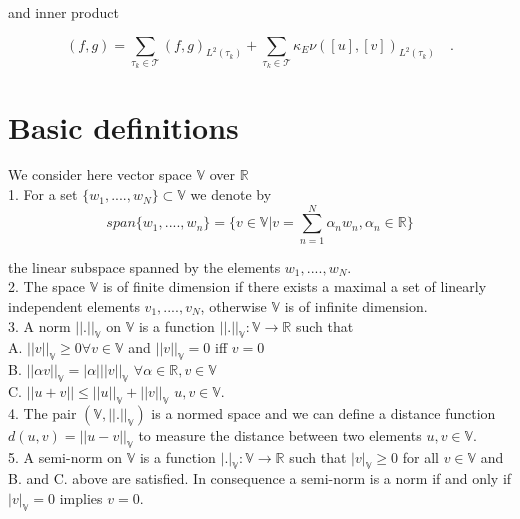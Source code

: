 \documentclass[a4paper]{book}
\begin{document}
and inner product

\begin{equation}
(f,g) = \sum_{\tau_k \in \mathcal{T}} (f,g)_{L^2(\tau_k)} + \sum_{\tau_k \in \mathcal{T}} \kappa_E \nu ([u],[v])_{L^2 (\tau_k)} \quad \textrm{.}
\end{equation}

\section{Basic definitions}

We consider here vector space $\mathbb{V}$ over $\mathbb{R}$\\

1. For a set $\lbrace w_1,....,w_N \rbrace \subset \mathbb{V}$ we denote by \\
\begin{equation} \label{vector space}
span \lbrace w_1,....,w_n \rbrace = \lbrace v \in \mathbb{V} | v = \sum_{n=1}^N \alpha_n w_n, \alpha_n \in \mathbb{R} \rbrace
\end{equation} 

the linear subspace spanned by the elements $w_1,....,w_N$.\\

2. The space $\mathbb{V}$ is of finite dimension if there exists a maximal a set of linearly independent elements $v_1,....,v_N$, otherwise $\mathbb{V}$ is of infinite dimension.\\

3. A norm $||.||_\mathbb{V}$ on $\mathbb{V}$ is a function $||.||_\mathbb{V} : \mathbb{V} \rightarrow \mathbb{R}$ such that\\ 

A. $||v||_\mathbb{V} \geq 0 \forall v \in \mathbb{V}$ and $||v||_\mathbb{V} = 0$ iff $v=0$\\
B. $||\alpha v||_\mathbb{V} = |\alpha| ||v||_\mathbb{V}$  $\forall \alpha \in \mathbb{R}, v \in \mathbb{V}$\\
C. $||u+v|| \leq ||u||_\mathbb{V} + ||v||_\mathbb{V}$ $u,v \in \mathbb{V}$.\\

4. The pair $(\mathbb{V},||.||_\mathbb{V})$ is a normed space and we can define a distance function $d(u,v) = ||u-v||_\mathbb{V}$ to measure the distance between two elements $u,v \in \mathbb{V}$.\\

5. A semi-norm on $\mathbb{V}$ is a function $|.|_\mathbb{V} : \mathbb{V} \rightarrow \mathbb{R}$ such that $|v|_\mathbb{V} \geq 0$ for all $v \in \mathbb{V}$ and B. and C. above are satisfied. In consequence a semi-norm is a norm if and only if $|v|_\mathbb{V} = 0$ implies  $v = 0$.\\
\end{document}
